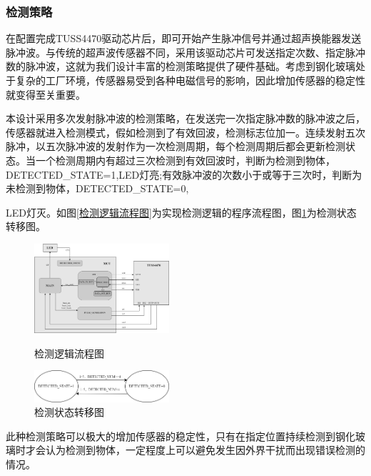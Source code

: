     \subsubsection{检测策略}
      在配置完成TUSS4470驱动芯片后，即可开始产生脉冲信号并通过超声换能器发送脉冲波。与传统的超声波传感器不同，采用该驱动芯片可发送指定次数、指定脉冲数的脉冲波，这就为我们设计丰富的检测策略提供了硬件基础。考虑到钢化玻璃处于复杂的工厂环境，传感器易受到各种电磁信号的影响，因此增加传感器的稳定性就变得至关重要。\par
      本设计采用多次发射脉冲波的检测策略，在发送完一次指定脉冲数的脉冲波之后，传感器就进入检测模式，假如检测到了有效回波，检测标志位加一。连续发射五次脉冲，以五次脉冲波的发射作为一次检测周期，每个检测周期后都会更新检测状态。当一个检测周期内有超过三次检测到有效回波时，判断为检测到物体，DETECTED\_STATE=1,LED灯亮;有效脉冲波的次数小于或等于三次时，判断为未检测到物体，DETECTED\_STATE=0,\par\noindent LED灯灭。如图\ref{检测逻辑流程图}为实现检测逻辑的程序流程图，图\ref{检测状态转移图}为检测状态转移图。
     \begin{figure}[H]
      \begin{minipage}{0.5\linewidth}
		\centering
		\includegraphics[width=5cm]{figure/Overall program block diagram.png}
		\caption{检测逻辑流程图}
		\label{检测逻辑流程图}%
	\end{minipage}
	\begin{minipage}{0.4\linewidth}
		\centering
		\includegraphics[width=5cm]{figure/LED state transition diagram.png}
		\caption{检测状态转移图}
		\label{检测状态转移图}%
	\end{minipage}
\end{figure}
    此种检测策略可以极大的增加传感器的稳定性，只有在指定位置持续检测到钢化玻璃时才会认为检测到物体，一定程度上可以避免发生因外界干扰而出现错误检测的情况。
    
      
      
  
      
